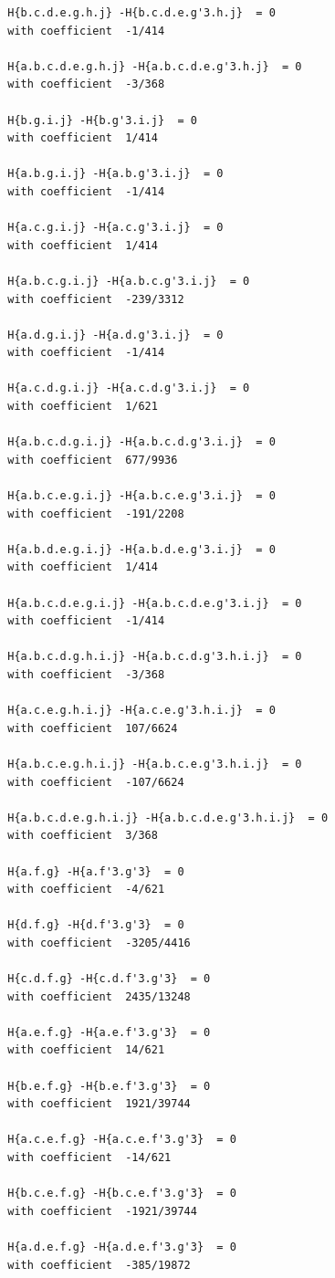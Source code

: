 \documentclass[11pt, a4paper]{kybernetika}
\begin{document}
\begin{verbatim}
		H{b.c.d.e.g.h.j} -H{b.c.d.e.g'3.h.j}  = 0
		with coefficient  -1/414
		
		H{a.b.c.d.e.g.h.j} -H{a.b.c.d.e.g'3.h.j}  = 0
		with coefficient  -3/368
		
		H{b.g.i.j} -H{b.g'3.i.j}  = 0
		with coefficient  1/414
		
		H{a.b.g.i.j} -H{a.b.g'3.i.j}  = 0
		with coefficient  -1/414
		
		H{a.c.g.i.j} -H{a.c.g'3.i.j}  = 0
		with coefficient  1/414
		
		H{a.b.c.g.i.j} -H{a.b.c.g'3.i.j}  = 0
		with coefficient  -239/3312
		
		H{a.d.g.i.j} -H{a.d.g'3.i.j}  = 0
		with coefficient  -1/414
		
		H{a.c.d.g.i.j} -H{a.c.d.g'3.i.j}  = 0
		with coefficient  1/621
		
		H{a.b.c.d.g.i.j} -H{a.b.c.d.g'3.i.j}  = 0
		with coefficient  677/9936
		
		H{a.b.c.e.g.i.j} -H{a.b.c.e.g'3.i.j}  = 0
		with coefficient  -191/2208
		
		H{a.b.d.e.g.i.j} -H{a.b.d.e.g'3.i.j}  = 0
		with coefficient  1/414
		
		H{a.b.c.d.e.g.i.j} -H{a.b.c.d.e.g'3.i.j}  = 0
		with coefficient  -1/414
		
		H{a.b.c.d.g.h.i.j} -H{a.b.c.d.g'3.h.i.j}  = 0
		with coefficient  -3/368
		
		H{a.c.e.g.h.i.j} -H{a.c.e.g'3.h.i.j}  = 0
		with coefficient  107/6624
		
		H{a.b.c.e.g.h.i.j} -H{a.b.c.e.g'3.h.i.j}  = 0
		with coefficient  -107/6624
		
		H{a.b.c.d.e.g.h.i.j} -H{a.b.c.d.e.g'3.h.i.j}  = 0
		with coefficient  3/368
		
		H{a.f.g} -H{a.f'3.g'3}  = 0
		with coefficient  -4/621
		
		H{d.f.g} -H{d.f'3.g'3}  = 0
		with coefficient  -3205/4416
		
		H{c.d.f.g} -H{c.d.f'3.g'3}  = 0
		with coefficient  2435/13248
		
		H{a.e.f.g} -H{a.e.f'3.g'3}  = 0
		with coefficient  14/621
		
		H{b.e.f.g} -H{b.e.f'3.g'3}  = 0
		with coefficient  1921/39744
		
		H{a.c.e.f.g} -H{a.c.e.f'3.g'3}  = 0
		with coefficient  -14/621
		
		H{b.c.e.f.g} -H{b.c.e.f'3.g'3}  = 0
		with coefficient  -1921/39744
		
		H{a.d.e.f.g} -H{a.d.e.f'3.g'3}  = 0
		with coefficient  -385/19872
		

\end{verbatim}
\end{document}
